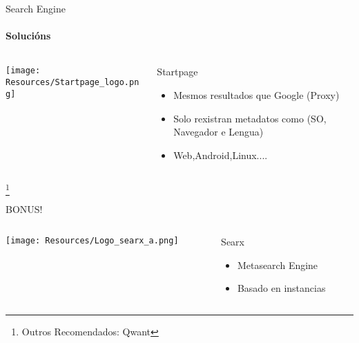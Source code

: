 \documentclass{beamer}
\begin{document}
\begin{frame}{Search Engine}
  \framesubtitle{Solucións}

  \begin{columns}
    \begin{column}{0.5\textwidth}
      \texttt{[image: Resources/Startpage\_logo.png]}

      \vspace{1cm}


    \end{column}

    \begin{column}{0.5\textwidth}
      \begin{block}{Startpage}
        \begin{itemize}
          \item Mesmos resultados que Google (Proxy)
          \item Solo rexistran metadatos como (SO, Navegador e Lengua)
          \item Web,Android,Linux....
        \end{itemize}
      \end{block}

    \end{column}

  \end{columns}

  \footnote{Outros Recomendados: Qwant}


\end{frame}


\begin{frame}{BONUS!}

  \begin{columns}
    \begin{column}{0.5\textwidth}
      \texttt{[image: Resources/Logo\_searx\_a.png]}

      \vspace{1cm}


    \end{column}

    \begin{column}{0.5\textwidth}
      \begin{block}{Searx}
        \begin{itemize}
          \item Metasearch Engine
          \item Basado en instancias
        \end{itemize}
      \end{block}

    \end{column}

  \end{columns}

\end{frame}
\end{document}
